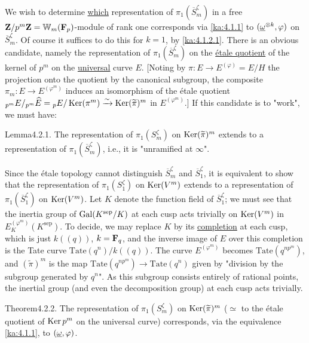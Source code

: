 We wish to determine \uline{which} representation of $\pi_1(\overline{S}_m^\zeta)$
in a free $\mathbf{Z}/p^m\mathbf{Z}=\mathbb{W}_m(\mathbf{F}_p)$-module of rank one corresponds via \eqref{ka:4.1.1} to
$(\underline{\omega}^{\otimes k},\varphi)$ on $\overline{S}_m^\zeta$. Of course it suffices to
do this for $k=1$, by \eqref{ka:4.1.2.1}. There is an obvious candidate, namely the
representation of $\pi_1(\overline{S}_m^\zeta)$ on the \uline{\'etale quotient}
of the kernel of $p^m$ on the \uline{universal} curve $E$. [Noting by
$\pi\colon E\to E^{(\varphi)}=E/H$ the projection onto the quotient by the
canonical subgroup, the composite $\pi_m\colon E\to E^{(\varphi^m)}$ induces an
isomorphism of the \'etale quotient
${}_{p^m}E/{}_{p^m}\widehat{E}={}_pE/\operatorname{Ker}(\pi^m)\xrightarrow{\sim}
\operatorname{Ker}(\widetilde{\pi})^m$ in $E^{(\varphi^m)}$.] If this candidate is to "work",
we must have:

\begin{kathm}{Lemma}{4.2.1.}
The representation of $\pi_1(S_m^\zeta)$ on $\operatorname{Ker}(\widetilde{\pi})^m$ extends to
a representation of $\pi_1(\overline{S}_m^\zeta)$, i.e., it is "unramified at
$\infty$".
\end{kathm}

\begin{kaproof}
Since the \'etale topology cannot distinguish $\overline{S}_m^\zeta$ and
$\overline{S}_1^\zeta$, it is equivalent to show that the representation of
$\pi_1(S_1^\zeta)$ on $\operatorname{Ker}(V^m)$ extends to a representation of
$\pi_1(\overline{S}_1^\zeta)$ on $\operatorname{Ker}(V^m)$. Let $K$ denote the function field
of $\overline{S}_1^\zeta$; we must see that the inertia group of
$\operatorname{Gal}(K^{\mathrm{sep}}/K)$ at each cusp acts trivially on $\operatorname{Ker}(V^m)$ in
$E_K^{(\varphi^m)}(K^{\mathrm{sep}})$. To decide, we may replace $K$ by its
\uline{completion} at each cusp, which is just $k((q))$, $k=\mathbf{F}_q$, and the
inverse image of $E$ over this completion is the Tate curve
$\mathrm{Tate}(q^n)/k((q))$. The curve $E^{(\varphi^m)}$ becomes
$\mathrm{Tate}(q^{np^m})$, and $(\widetilde{\pi})^m$ is the map
$\mathrm{Tate}(q^{np^m})\to\mathrm{Tate}(q^n)$ given by "division by the
subgroup generated by $q^n$". As this subgroup consists entirely of rational
points, the inertial group (and even the decomposition group) at each cusp acts
trivially.
\end{kaproof}

\begin{kathm}{Theorem}{4.2.2.}
The representation of $\pi_1(S_m^\zeta)$ on $\operatorname{Ker}(\widetilde{\pi})^m$
($\simeq$ to the \'etale quotient of $\operatorname{Ker} p^m$ on the universal curve)
corresponds, via the equivalence \eqref{ka:4.1.1}, to $(\underline{\omega},\varphi)$.
\end{kathm}

